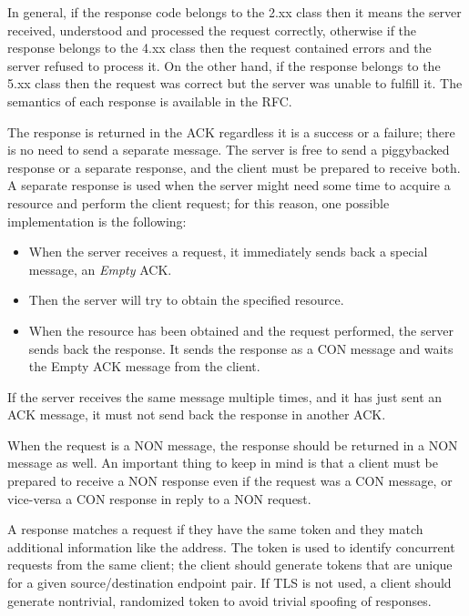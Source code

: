 	
	
	In general, if the response code belongs to the 2.xx class then it means the server received, understood and processed the request correctly, otherwise if the response belongs to the 4.xx class then the request contained errors and the server refused to process it. On the other hand, if the response belongs to the 5.xx class then the request was correct but the server was unable to fulfill it.\newline
	The semantics of each response is available in the RFC.\newline
	
	The response is returned in the ACK regardless it is a success or a failure; there is no need to send a separate message.\newline
	The server is free to send a piggybacked response or a separate response, and the client must be prepared to receive both.\newline
	A separate response is used when the server might need some time to acquire a resource and perform the client request; for this reason, one possible implementation is the following:
	\begin{itemize}
		\item When the server receives a request, it immediately sends back a special message, an \emph{Empty} ACK.
		\item Then the server will try to obtain the specified resource.
		\item When the resource has been obtained and the request performed, the server sends back the response.
		It sends the response as a CON message and waits the Empty ACK message from the client.
	\end{itemize}
	If the server receives the same message multiple times, and it has just sent an ACK message, it must not send back the response in another ACK.\newline
	
	When the request is a NON message, the response should be returned in a NON message as well.\newline
	An important thing to keep in mind is that a client must be prepared to receive a NON response even if the request was a CON message, or vice-versa a CON response in reply to a NON request.\newline
	
	A response matches a request if they have the same token and they match additional information like the address.\newline
	The token is used to identify concurrent requests from the same client; the client should generate tokens that are unique for a given source/destination endpoint pair.\newline
	If TLS is not used, a client should generate nontrivial, randomized token to avoid trivial spoofing of responses.\newline
	
